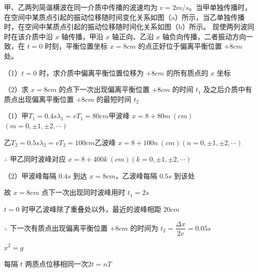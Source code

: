 
\begin{problem}[19.（6分）]
甲、乙两列简谐横波在同一介质中传播的波速均为 $v=2\unit{m/s}$。当甲单独传播时，在空间中某质点引起的振动位移随时间变化关系如图（a）所示，当乙单独传播时，在空间中某质点引起的振动位移随时间化关系如图（b）所示。%
现使两列波同时在该介质中沿 $x$ 轴传播，甲沿 $x$ 轴正向、乙沿 $x$ 轴负向传播，二者振动方向一致，在 $t=0$ 时刻，平衡位置坐标 $x=8\unit{cm}$ 的点正好位于偏离平衡位置 $+8\unit{cm}$ 处。

（1）$t=0$ 时，求介质中偏离平衡位置位移为 $+8\unit{cm}$ 的所有质点的 $x$ 坐标

（2）求 $x=8\unit{cm}$ 的点下一次出现偏离平衡位置 $+8\unit{cm}$ 的时间 $t_1$ 及之后介质中有质点出现偏离平衡位置 $+8\unit{cm}$ 的最短时间 $t_2$

\begin{solution}

（1）甲\quad $T_1=0.4\unit{s}$\quad $\lambda_1=vT_1=80\unit{cm}$\quad 甲波峰 $x=8+80m\ (\unit{cm})$\quad $(m=0,\pm1,\pm2,\cdots)$

\hspace{1.6em}乙\quad $T_2=0.5\unit{s}$\quad $\lambda_2=vT_2=100\unit{cm}$\quad 乙波峰 $x=8+100n\ (\unit{cm})$\quad $(n=0,\pm1,\pm2,\cdots)$

\hspace{1.6em}$\therefore$ 甲乙同时波峰对应 $x=8+400k\ (\unit{cm})$\quad $(k=0,\pm1,\pm2,\cdots)$

（2）甲波峰每隔 $0.4\unit{s}$ 到达 $x=8\unit{cm}$，乙波峰每隔 $0.5\unit{s}$ 到该处

\hspace{1.6em}故 $x=8\unit{cm}$ 点下一次出现同时波峰用时 $t_1=2\unit{s}$

\hspace{1.6em}$t=0$ 时甲乙波峰除了重叠处以外，最近的波峰相距 $20\unit{cm}$

\hspace{1.6em}$\therefore$ 下一次有质点出现偏离平衡位置 $+8\unit{cm}$ 的时间为 $t_2=\dfrac{\Delta x}{2v}=0.05\unit{s}$
\end{solution}
\end{problem}
\quad $x^2=g$%

每隔 $t$ 两质点位移相同一次\quad $2t=nT$
